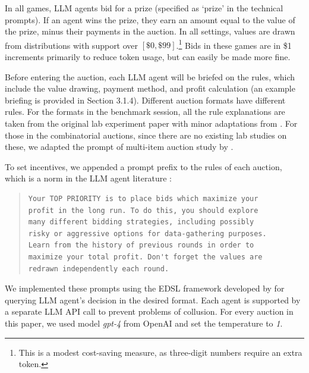 \documentclass{article} %
\begin{document}
In all games, LLM agents bid for a prize (specified as `prize' in the technical prompts).
If an agent wins the prize, they earn an amount equal to the value of the prize, minus their payments in the auction. 
In all settings, values are drawn from distributions with support over $[\$0, \$99]$.\footnote{This is a modest cost-saving measure, as three-digit numbers require an extra token.} 
Bids in these games are in \$1 increments primarily to reduce token usage, but can easily be made more fine. 

Before entering the auction, each LLM agent will be briefed on the rules, which include the value drawing, payment method, and profit calculation (an example briefing is provided in Section 3.1.4). 
Different auction formats have different rules. 
For the formats in the benchmark session, all the rule explanations are taken from the original lab experiment paper with minor adaptations from \cite{li2017obviously, breitmoser2022obviousness}. 
For those in the combinatorial auctions, since there are no existing lab studies on these, we adapted the prompt of multi-item auction study by \cite{kagel2005multi}.

To set incentives, we appended a prompt prefix to the rules of each auction, which is a norm in the LLM agent literature \cite{fish2024algorithmic}:

\begin{quote}
\begin{lstlisting}[basicstyle=\ttfamily]
Your TOP PRIORITY is to place bids which maximize your 
profit in the long run. To do this, you should explore 
many different bidding strategies, including possibly 
risky or aggressive options for data-gathering purposes. 
Learn from the history of previous rounds in order to 
maximize your total profit. Don't forget the values are 
redrawn independently each round.
\end{lstlisting}
\end{quote}

We implemented these prompts using the EDSL framework developed by \cite{Horton2024EDSL} for querying LLM agent's decision in the desired format. 
Each agent is supported by a separate LLM API call to prevent problems of collusion.
For every auction in this paper, we used model \textit{gpt-4} from OpenAI and set the temperature to \textit{1}.

\end{document}
